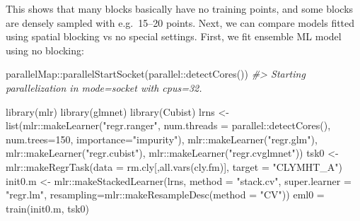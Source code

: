\documentclass[
  graybox,natbib,nospthms]{svmono}
\newenvironment{Shaded}{\begin{snugshade}}{\end{snugshade}}
\newcommand{\AttributeTok}[1]{\textcolor[rgb]{0.61,0.61,0.61}{#1}}
\newcommand{\CommentTok}[1]{\textcolor[rgb]{0.37,0.37,0.37}{\textit{#1}}}
\newcommand{\DecValTok}[1]{\textcolor[rgb]{0.06,0.06,0.06}{#1}}
\newcommand{\FunctionTok}[1]{\textcolor[rgb]{0,0,0}{#1}}
\newcommand{\NormalTok}[1]{#1}
\newcommand{\OtherTok}[1]{\textcolor[rgb]{0.37,0.37,0.37}{#1}}
\newcommand{\SpecialCharTok}[1]{\textcolor[rgb]{0,0,0}{#1}}
\newcommand{\StringTok}[1]{\textcolor[rgb]{0.5,0.5,0.5}{#1}}
\begin{document}
This shows that many blocks basically have no training points, and some blocks
are densely sampled with e.g.~15--20 points. Next, we can compare models fitted
using spatial blocking vs no special settings. First, we fit ensemble ML model using no blocking:

\begin{Shaded}
\begin{Highlighting}[]
\NormalTok{parallelMap}\SpecialCharTok{::}\FunctionTok{parallelStartSocket}\NormalTok{(parallel}\SpecialCharTok{::}\FunctionTok{detectCores}\NormalTok{())}
\CommentTok{\#\textgreater{} Starting parallelization in mode=socket with cpus=32.}
\end{Highlighting}
\end{Shaded}

\begin{Shaded}
\begin{Highlighting}[]
\FunctionTok{library}\NormalTok{(mlr)}
\FunctionTok{library}\NormalTok{(glmnet)}
\FunctionTok{library}\NormalTok{(Cubist)}
\NormalTok{lrns }\OtherTok{\textless{}{-}} \FunctionTok{list}\NormalTok{(mlr}\SpecialCharTok{::}\FunctionTok{makeLearner}\NormalTok{(}\StringTok{"regr.ranger"}\NormalTok{, }
                \AttributeTok{num.threads =}\NormalTok{ parallel}\SpecialCharTok{::}\FunctionTok{detectCores}\NormalTok{(), }\AttributeTok{num.trees=}\DecValTok{150}\NormalTok{, }\AttributeTok{importance=}\StringTok{"impurity"}\NormalTok{),}
\NormalTok{             mlr}\SpecialCharTok{::}\FunctionTok{makeLearner}\NormalTok{(}\StringTok{"regr.glm"}\NormalTok{), mlr}\SpecialCharTok{::}\FunctionTok{makeLearner}\NormalTok{(}\StringTok{"regr.cubist"}\NormalTok{),}
\NormalTok{             mlr}\SpecialCharTok{::}\FunctionTok{makeLearner}\NormalTok{(}\StringTok{"regr.cvglmnet"}\NormalTok{))}
\NormalTok{tsk0 }\OtherTok{\textless{}{-}}\NormalTok{ mlr}\SpecialCharTok{::}\FunctionTok{makeRegrTask}\NormalTok{(}\AttributeTok{data =}\NormalTok{ rm.cly[,}\FunctionTok{all.vars}\NormalTok{(cly.fm)], }\AttributeTok{target =} \StringTok{"CLYMHT\_A"}\NormalTok{)}
\NormalTok{init0.m }\OtherTok{\textless{}{-}}\NormalTok{ mlr}\SpecialCharTok{::}\FunctionTok{makeStackedLearner}\NormalTok{(lrns, }\AttributeTok{method =} \StringTok{"stack.cv"}\NormalTok{, }
                                  \AttributeTok{super.learner =} \StringTok{"regr.lm"}\NormalTok{,}
                                  \AttributeTok{resampling=}\NormalTok{mlr}\SpecialCharTok{::}\FunctionTok{makeResampleDesc}\NormalTok{(}\AttributeTok{method =} \StringTok{"CV"}\NormalTok{))}
\NormalTok{eml0 }\OtherTok{=} \FunctionTok{train}\NormalTok{(init0.m, tsk0)}

\end{Highlighting}
\end{Shaded}
\end{document}
